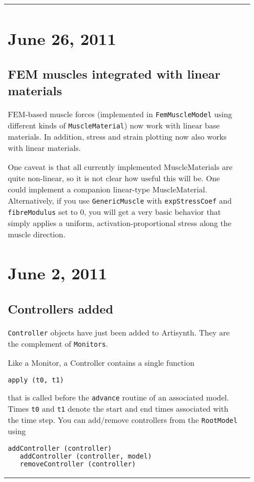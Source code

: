 \documentclass{article}
\begin{document}
\begin{tabular}{ll}
\section*{June 26, 2011}

\subsection*{FEM muscles integrated with linear materials}

FEM-based muscle forces (implemented in {\tt FemMuscleModel} using
different kinds of {\tt MuscleMaterial}) now work with linear base
materials. In addition, stress and strain plotting now also works with
linear materials.

One caveat is that all currently implemented MuscleMaterials are quite
non-linear, so it is not clear how useful this will be.  One could
implement a companion linear-type MuscleMaterial.  Alternatively, if
you use {\tt GenericMuscle} with {\tt expStressCoef} and {\tt fibreModulus} set to
0, you will get a very basic behavior that simply applies a uniform,
activation-proportional stress along the muscle direction.

\section*{June 2, 2011}

\subsection*{Controllers added}

{\tt Controller} objects have just been added to Artisynth. They are the
complement of {\tt Monitors}. 

Like a Monitor, a Controller contains a single function 

\begin{lstlisting}[]
   apply (t0, t1)
\end{lstlisting}

that is called before the {\tt advance} routine of an associated model.
Times {\tt t0} and {\tt t1} denote the start and end times associated with the
time step. You can add/remove controllers from the {\tt RootModel}
using 

\begin{lstlisting}[]
   addController (controller)
   addController (controller, model)
   removeController (controller)
\end{lstlisting}


\end{tabular}
\end{document}
